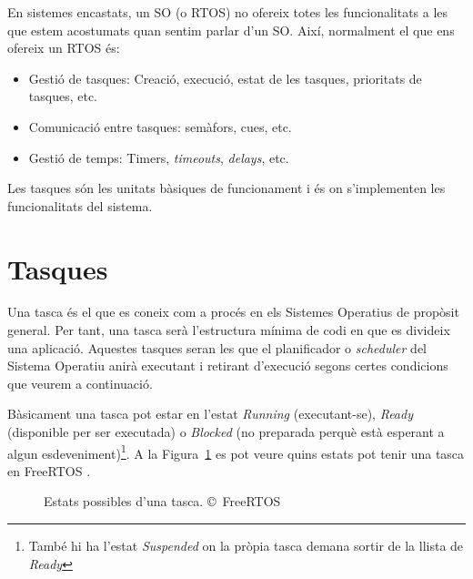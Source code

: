 En sistemes encastats, un SO (o RTOS) no ofereix totes les funcionalitats a les que estem acostumats quan sentim parlar d'un SO. Així, normalment el que ens ofereix un RTOS és:

\begin{itemize}
 \item Gestió de tasques: Creació, execució, estat de les tasques, prioritats de tasques, etc.
 \item Comunicació entre tasques: semàfors, cues, etc.
 \item Gestió de temps: Timers, {\em timeouts}, {\em delays}, etc.
\end{itemize}

Les tasques són les unitats bàsiques de funcionament i és on s'implementen les funcionalitats del sistema.

\section{Tasques}

Una tasca és el que es coneix com a procés en els Sistemes Operatius de propòsit general. Per tant, una tasca serà l'estructura mínima de codi en que es divideix una aplicació. Aquestes tasques seran les que el planificador o {\em scheduler} del Sistema Operatiu anirà executant i retirant d'execució segons certes condicions que veurem a continuació.

Bàsicament una tasca pot estar en l'estat {\em Running} (executant-se), {\em Ready} (disponible per ser executada) o {\em Blocked} (no preparada perquè està esperant a algun esdeveniment)\footnote{També hi ha l'estat {\em Suspended} on la pròpia tasca demana sortir de la llista de {\em Ready}}. A la Figura~\ref{fig:taskstate} es pot veure quins estats pot tenir una tasca en FreeRTOS \cite[92]{FreeRTOSBook}.


\begin{figure}
 \centering
 \caption{Estats possibles d'una tasca. \copyright\ FreeRTOS}
 \label{fig:taskstate}
\end{figure}

